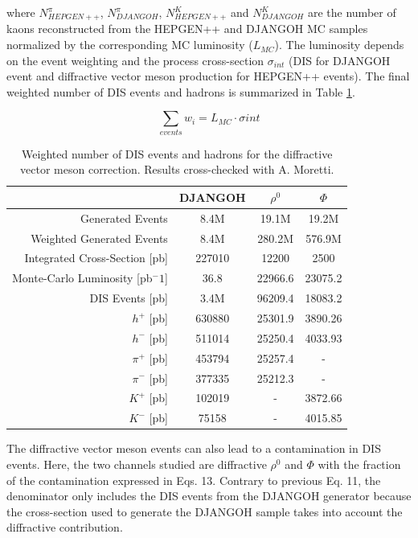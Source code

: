 where $N^{\pi}_{HEPGEN++}$, $N^{\pi}_{DJANGOH}$, $N^K_{HEPGEN++}$ and $N^K_{DJANGOH}$ are the number of kaons reconstructed from the HEPGEN++ and DJANGOH MC samples normalized by the corresponding MC luminosity ($L_{MC}$). The luminosity depends on the event weighting and the process cross-section $\sigma_{int}$ (DIS for DJANGOH event and diffractive vector meson production for HEPGEN++ events). The final weighted number of DIS events and hadrons is summarized in Table \ref{DVM}.

\begin{equation}
  \sum_{events} w_i = L_{MC} \cdot \sigma{int}
\end{equation}

\begin{table}
	\centering
	\begin{tabular}{rccc}
    \hline
     & DJANGOH & $\rho^0$ & $\Phi$ \\
    \hline
    Generated Events & 8.4M & 19.1M & 19.2M  \\
    Weighted Generated Events & 8.4M & 280.2M & 576.9M  \\
		Integrated Cross-Section [pb] & 227010 & 12200 & 2500  \\
		Monte-Carlo Luminosity [pb$^-1$] & 36.8 & 22966.6 & 23075.2  \\
    \hline
		DIS Events [pb] & 3.4M & 96209.4 & 18083.2  \\
		$h^+$ [pb] & 630880 & 25301.9 & 3890.26  \\
		$h^-$ [pb] & 511014 & 25250.4 & 4033.93  \\
		$\pi^+$ [pb] & 453794 & 25257.4 & -  \\
		$\pi^-$ [pb] & 377335 & 25212.3 & -  \\
		$K^+$ [pb] & 102019 & - & 3872.66  \\
		$K^-$ [pb] & 75158 & - & 4015.85 \\
  \end{tabular}
  \caption{Weighted number of DIS events and hadrons for the diffractive vector meson correction. Results cross-checked with A. Moretti.}
  \label{DVM}
\end{table}

The diffractive vector meson events can also lead to a contamination in DIS events. Here, the two channels studied are diffractive $\rho^0$ and $\Phi$ with the fraction of the contamination expressed in Eqs. 13. Contrary to previous Eq. 11, the denominator only includes the DIS events from the DJANGOH generator because the cross-section used to generate the DJANGOH sample takes into account the diffractive contribution.

